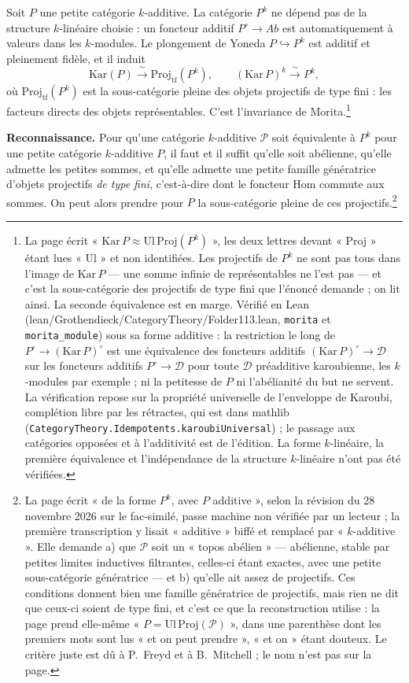 \documentclass[11pt,a4paper]{article}
\begin{document}
Soit $P$ une petite catégorie $k$-additive. La catégorie $P^{k}$ ne dépend pas
de la structure $k$-linéaire choisie : un foncteur additif $P^{\circ} \to Ab$ est
automatiquement à valeurs dans les $k$-modules. Le plongement de Yoneda
$P \hookrightarrow P^{k}$ est additif et pleinement fidèle, et il induit
\[
\mathrm{Kar}(P) \xrightarrow{\;\sim\;} \mathrm{Proj}_{\mathrm{tf}}(P^{k}),
\qquad
(\mathrm{Kar}\, P)^{k} \xrightarrow{\;\sim\;} P^{k},
\]
où $\mathrm{Proj}_{\mathrm{tf}}(P^{k})$ est la sous-catégorie pleine des objets
projectifs de type fini : les facteurs directs des objets représentables.
C'est l'invariance de Morita.\footnote{La page écrit « $\mathrm{Kar}\, P
\approx \mathrm{Ul}\,\mathrm{Proj}(P^{k})$ », les deux lettres devant
« Proj » étant lues « Ul » et non identifiées. Les projectifs de $P^{k}$ ne sont
pas tous dans l'image de $\mathrm{Kar}\, P$ --- une somme infinie de
représentables ne l'est pas --- et c'est la sous-catégorie des projectifs de
type fini que l'énoncé demande ; on lit ainsi. La seconde équivalence est en
marge. Vérifié en Lean (lean/Grothendieck/CategoryTheory/Folder113.lean, \texttt{morita} et
\texttt{morita\_module}) sous sa forme additive : la restriction le long de
$P^{\circ} \to (\mathrm{Kar}\, P)^{\circ}$ est une équivalence des foncteurs
additifs $(\mathrm{Kar}\, P)^{\circ} \to \mathcal{D}$ sur les foncteurs
additifs $P^{\circ} \to \mathcal{D}$ pour toute $\mathcal{D}$ préadditive
karoubienne, les $k$-modules par exemple ; ni la petitesse de $P$ ni
l'abélianité du but ne servent. La vérification repose sur la propriété
universelle de l'enveloppe de Karoubi, complétion libre par les rétractes,
qui est dans mathlib (\texttt{CategoryTheory.Idempotents.karoubiUniversal}) ;
le passage aux catégories opposées et à l'additivité est de l'édition. La
forme $k$-linéaire, la première équivalence et l'indépendance de la
structure $k$-linéaire n'ont pas été vérifiées.}

\textbf{Reconnaissance.} Pour qu'une catégorie $k$-additive $\mathcal{P}$ soit
équivalente à $P^{k}$ pour une petite catégorie $k$-additive $P$, il faut et il
suffit qu'elle soit abélienne, qu'elle admette les petites sommes, et qu'elle
admette une petite famille génératrice d'objets projectifs \emph{de type fini},
c'est-à-dire dont le foncteur $\mathrm{Hom}$ commute aux sommes. On peut alors
prendre pour $P$ la sous-catégorie pleine de ces projectifs.\footnote{La page
écrit « de la forme $P^{k}$, avec $P$ additive », selon la révision du 28 novembre 2026 sur le fac-similé, passe machine non vérifiée par un lecteur ;
la première transcription y lisait « additive » biffé et remplacé par
« $k$-additive ». Elle
demande a) que $\mathcal{P}$ soit un « topos abélien » --- abélienne, stable
par petites limites inductives filtrantes, celles-ci étant exactes, avec une
petite sous-catégorie génératrice --- et b) qu'elle ait assez de projectifs.
Ces conditions donnent bien une famille génératrice de projectifs, mais rien
ne dit que ceux-ci soient de type fini, et c'est ce que la reconstruction
utilise : la page prend elle-même « $P = \mathrm{Ul}\,\mathrm{Proj}(\mathcal{P})$ »,
dans une parenthèse dont les premiers mots sont lus « et on peut prendre »,
« et on » étant douteux.
Le critère juste est dû à P.~Freyd et à B.~Mitchell ; le nom n'est pas sur
la page.}
\end{document}
